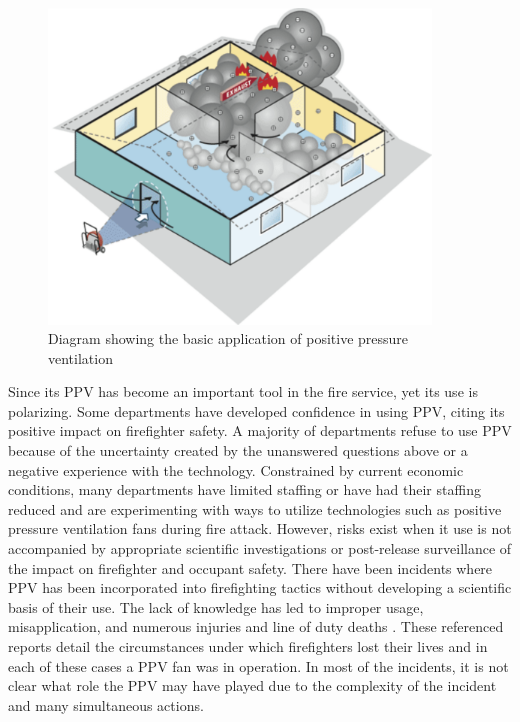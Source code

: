 \documentclass{article}
\begin{document}
\begin{figure}[H]
	\centering
	\includegraphics[width = 4in]{0_Images/Tactical_Considerations/Exhaust_Over_Cone/ppv_illistration.pdf}
	\caption{Diagram showing the basic application of positive pressure ventilation}
	\label{fig:PPV_Diagram}
\end{figure}

Since its PPV has become an important tool in the fire service, yet its use is polarizing. Some departments have developed confidence in using PPV, citing its positive impact on firefighter safety. A majority of departments refuse to use PPV because of the uncertainty created by the unanswered questions above or a negative experience with the technology. Constrained by current economic conditions, many departments have limited staffing or have had their staffing reduced and are experimenting with ways to utilize technologies such as positive pressure ventilation fans during fire attack. However, risks exist when it use is not accompanied by appropriate scientific investigations or post-release surveillance of the impact on firefighter and occupant safety. There have been incidents where PPV has been incorporated into firefighting tactics without developing a scientific basis of their use. The lack of knowledge has led to improper usage, misapplication, and numerous injuries and line of duty deaths \cite{NIOSHF2000-44} \cite{NIOSH98F-32} \cite{TexasFMFY07-02} \cite{ContraCostaFalaityInvestigation} \cite{NIOSHF2004-02} \cite{NIOSHF2002-12}. These referenced reports detail the circumstances under which firefighters lost their lives and in each of these cases a PPV fan was in operation. In most of the incidents, it is not clear what role the PPV may have played due to the complexity of the incident and many simultaneous actions. 
\end{document}
